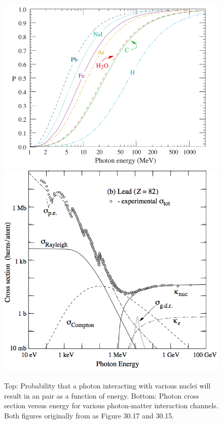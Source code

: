 \begin{figure}[!]
	\centering
	\vspace{-0.5cm}
		\includegraphics[width=0.85\columnwidth]{Figures/Beringer12_30_17.png}
		\includegraphics[width=0.85\columnwidth]{Figures/Beringer12_30_15.png}
	\caption[Top: Probability of photon conversion to e$^-$ e$^+$ pair. Bottom: Photon cross section versus energy]{Top: Probability that a photon interacting with various nuclei will result in an \ee{} pair as a function of energy. Bottom: Photon cross section versus energy for various photon-matter interaction channels. Both figures originally from \cite{Beringer12} as Figure 30.17 and 30.15.}
	\label{fig:pairProd}
\end{figure}

